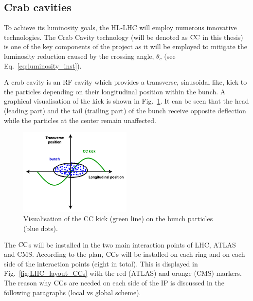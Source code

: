

\subsection{Crab cavities}\label{subsec:CC_intro}
To achieve its luminosity goals, the HL-LHC will employ numerous innovative technologies. The Crab Cavity technology (will be denoted as ${\mathrm{CC}}$ in this thesis)~\cite{Calaga:2673544} is one of the key components of the project as it will be employed to mitigate the luminosity reduction caused by the crossing angle, $\theta_c$ (see Eq.~\eqref{eq:luminosity_inst}).

A crab cavity is an RF cavity which provides a transverse, sinusoidal like, kick to the particles depending on their longitudinal position within the bunch. A graphical visualisation of the kick is shown in Fig.~\ref{fig:cc_simple_kick}. It can be seen that the head (leading part) and the tail (trailing part) of the bunch receive opposite deflection while the particles at the center remain unaffected.

\begin{figure}[!h] %
    \centering         
    \includegraphics[width=0.5\textwidth]{images/introduction/sin_CC_kick_LHC_beams.drawio.png}
        \caption{Visualisation of the CC kick (green line) on the bunch particles (blue dots).} %
        \label{fig:cc_simple_kick}
 \end{figure}

The ${\mathrm{CC}}$s will be installed in the two main interaction points of LHC, ATLAS and CMS. According to the plan, ${\mathrm{CC}}$s will be installed on each ring and on each side of the interaction points (eight in total). This is displayed in Fig.~\ref{fig:LHC_layout_CCs} with the red (ATLAS) and orange (CMS) markers. The reason why ${\mathrm{CC}}$s are needed on each side of the IP is discussed in the following paragraphs (local vs global scheme).

